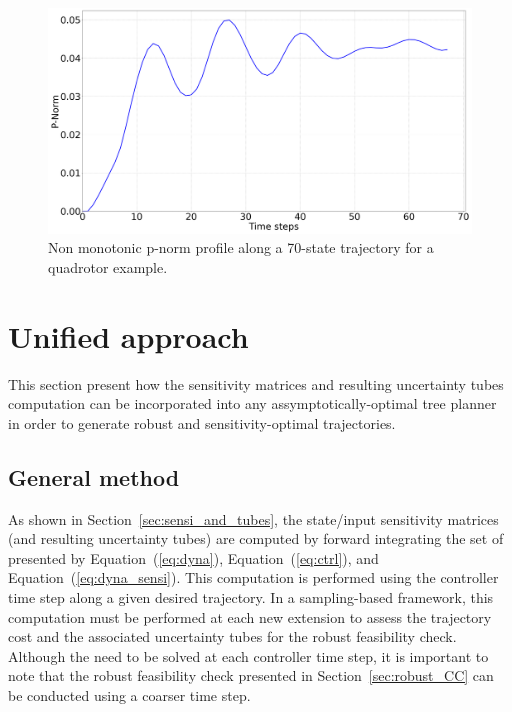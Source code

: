 \begin{figure} [htp]
    \centering
    \includegraphics[width=0.7\linewidth]{figures/samp/non_monotoic.png} 
    \caption{Non monotonic p-norm profile along a 70-state trajectory for a quadrotor example.}%
    \label{fig:monotonic}%
\end{figure}

\section{Unified approach}\label{sec:unified}

This section present how the sensitivity matrices and resulting uncertainty tubes computation can be incorporated into any assymptotically-optimal tree planner in order to generate robust and sensitivity-optimal trajectories.  

\subsection{General method}\label{sec:general_method}

As shown in Section~\ref{sec:sensi_and_tubes}, the state/input sensitivity matrices (and resulting uncertainty tubes) are computed by forward integrating the set of  presented by Equation~(\ref{eq:dyna}), Equation~(\ref{eq:ctrl}), and Equation~(\ref{eq:dyna_sensi}).
This computation is performed using the controller time step along a given desired trajectory.
In a sampling-based framework, this computation must be performed at each new extension to assess the trajectory cost and the associated uncertainty tubes for the robust feasibility check.
Although the  need to be solved at each controller time step, it is important to note that the robust feasibility check presented in Section~\ref{sec:robust_CC} can be conducted using a coarser time step.

